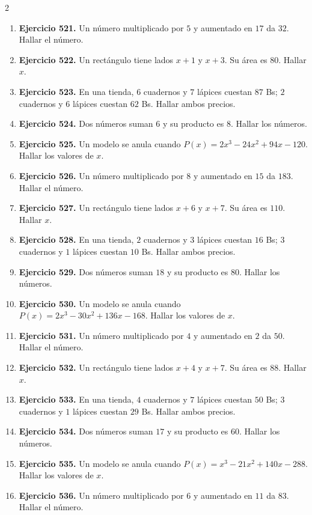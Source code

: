 \documentclass[10pt,a4paper]{article}
\begin{document}
\begin{multicols}{2}
\begin{enumerate}[label=\textbf{\arabic*.}]
\item \textbf{Ejercicio 521.} Un número multiplicado por \(5\) y aumentado en \(17\) da \(32\). Hallar el número.
\item \textbf{Ejercicio 522.} Un rectángulo tiene lados \(x+1\) y \(x+3\). Su área es \(80\). Hallar \(x\).
\item \textbf{Ejercicio 523.} En una tienda, \(6\) cuadernos y \(7\) lápices cuestan \(87\) Bs; \(2\) cuadernos y \(6\) lápices cuestan \(62\) Bs. Hallar ambos precios.
\item \textbf{Ejercicio 524.} Dos números suman \(6\) y su producto es \(8\). Hallar los números.
\item \textbf{Ejercicio 525.} Un modelo se anula cuando \(P(x)=2 x^{3} - 24 x^{2} + 94 x - 120\). Hallar los valores de \(x\).
\item \textbf{Ejercicio 526.} Un número multiplicado por \(8\) y aumentado en \(15\) da \(183\). Hallar el número.
\item \textbf{Ejercicio 527.} Un rectángulo tiene lados \(x+6\) y \(x+7\). Su área es \(110\). Hallar \(x\).
\item \textbf{Ejercicio 528.} En una tienda, \(2\) cuadernos y \(3\) lápices cuestan \(16\) Bs; \(3\) cuadernos y \(1\) lápices cuestan \(10\) Bs. Hallar ambos precios.
\item \textbf{Ejercicio 529.} Dos números suman \(18\) y su producto es \(80\). Hallar los números.
\item \textbf{Ejercicio 530.} Un modelo se anula cuando \(P(x)=2 x^{3} - 30 x^{2} + 136 x - 168\). Hallar los valores de \(x\).
\item \textbf{Ejercicio 531.} Un número multiplicado por \(4\) y aumentado en \(2\) da \(50\). Hallar el número.
\item \textbf{Ejercicio 532.} Un rectángulo tiene lados \(x+4\) y \(x+7\). Su área es \(88\). Hallar \(x\).
\item \textbf{Ejercicio 533.} En una tienda, \(4\) cuadernos y \(7\) lápices cuestan \(50\) Bs; \(3\) cuadernos y \(1\) lápices cuestan \(29\) Bs. Hallar ambos precios.
\item \textbf{Ejercicio 534.} Dos números suman \(17\) y su producto es \(60\). Hallar los números.
\item \textbf{Ejercicio 535.} Un modelo se anula cuando \(P(x)=x^{3} - 21 x^{2} + 140 x - 288\). Hallar los valores de \(x\).
\item \textbf{Ejercicio 536.} Un número multiplicado por \(6\) y aumentado en \(11\) da \(83\). Hallar el número.

\end{enumerate}
\end{multicols}
\end{document}
